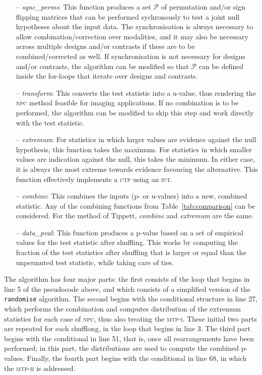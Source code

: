 \begin{itemize}[leftmargin=*]
\item[--] \emph{sync\_perms}: This function produces a set $\mathcal{P}$ of permutation and/or sign flipping matrices that can be performed sychronously to test a joint null hypotheses about the input data. The synchronisation is always necessary to allow combination/correction over modalities, and it may also be necessary across multiple designs and/or contrasts if these are to be combined/corrected as well. If synchronisation is not necessary for designs and/or contrasts, the algorithm can be modified so that $\mathcal{P}$ can be defined inside the for-loops that iterate over designs and contrasts.
\item[--] \emph{transform}: This converts the test statistic into a u-value, thus rendering the \textsc{npc} method feasible for imaging applications. If no combination is to be performed, the algorithm can be modified to skip this step and work directly with the test statistic.
\item[--] \emph{extremum}: For statistics in which larger values are evidence against the null hypothesis, this function takes the maximum. For statistics in which smaller values are indication against the null, this takes the minimum. In either case, it is always the most extreme towards evidence favouring the alternative. This function effectively implements a \textsc{ctp} using an \textsc{iut}.
\item[--] \emph{combine}: This combines the inputs (p- or u-values) into a new, combined statistic. Any of the combining functions from Table~\ref{tab:comparison} can be considered. For the method of Tippett, \emph{combine} and \emph{extremum} are the same.
\item[--] \emph{data\_pval}: This function produces a p-value based on a set of empirical values for the test statistic after shuffling. This works by computing the fraction of the test statistics after shuffling that is larger or equal than the unpermuted test statistic, while taking care of ties.
\end{itemize}

The algorithm has four major parts: the first consists of the loop that begins in line 5 of the pseudocode above, and which consists of a simplified version of the \texttt{randomise} algorithm. The second begins with the conditional structure in line 27, which performs the combination and computes distribution of the extremum statistics for each case of \textsc{npc}, thus also treating the \textsc{mtp-i}. These initial two parts are repeated for each shufflong, in the loop that begins in line 3. The third part begins with the conditional in line 51, that is, once all rearrangements have been performed; in this part, the distributions are used to compute the combined p-values. Finally, the fourth part begins with the conditional in line 68, in which the \textsc{mtp-ii} is addressed.

